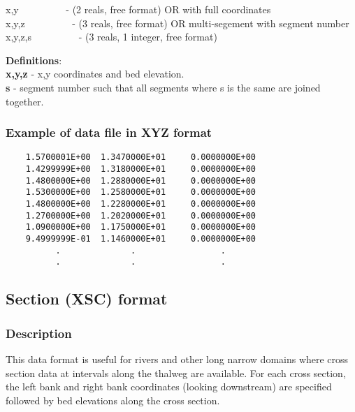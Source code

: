 \documentclass{article}
\begin{document}
\noindent
x,y \ \ \ \ \ \ \ \ \ {}- (2 reals, free format)\newline
OR with full coordinates \\
x,y,z \ \ \ \ \ \ \ \ \ {}- (3 reals, free format)\newline
OR multi-segement with segment number \\
x,y,z,s \ \ \ \ \ \ \ \ \ {}- (3 reals, 1 integer, free format)\newline

\noindent\textbf{Definitions}:\\ 

\noindent
\textbf{x,y,z} - x,y coordinates and bed elevation. \\
\textbf{s} - segment number such that all segments where s is the same are joined together. \\


\subsubsection{Example of data file in XYZ format}

\begin{small}
\begin{lstlisting}
    1.5700001E+00  1.3470000E+01     0.0000000E+00   
    1.4299999E+00  1.3180000E+01     0.0000000E+00   
    1.4800000E+00  1.2880000E+01     0.0000000E+00   
    1.5300000E+00  1.2580000E+01     0.0000000E+00   
    1.4800000E+00  1.2280000E+01     0.0000000E+00   
    1.2700000E+00  1.2020000E+01     0.0000000E+00   
    1.0900000E+00  1.1750000E+01     0.0000000E+00   
    9.4999999E-01  1.1460000E+01     0.0000000E+00   
          .              .                 .     
          .              .                 .    
\end{lstlisting}
\end{small}

\newpage
\subsection[Section (XSC) format]{Section (XSC) format}

\subsubsection[Description]{Description}

This data format is useful for rivers and other long narrow domains where cross section data at
intervals along the thalweg are available. For each cross section, the left bank and right bank coordinates 
(looking downstream) are specified followed by bed elevations along the cross section. \\
\end{document}
